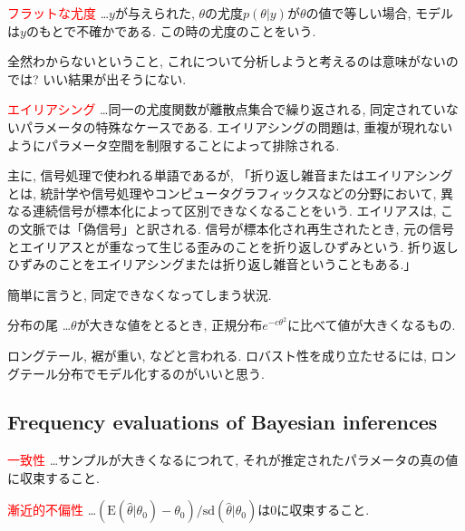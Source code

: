 \documentclass[11pt,a4pape,dvipdfmx]{jarticle}
\newcommand{\tcr}[1]{\textcolor{red}{#1}}
\begin{document}
\begin{itembox}[l]{\tcr{フラットな尤度}}
…$y$が与えられた, $\theta$の尤度$p(\theta|y)$が$\theta$の値で等しい場合, モデルは$y$のもとで不確かである.
この時の尤度のことをいう.
\end{itembox}

全然わからないということ, これについて分析しようと考えるのは意味がないのでは?
いい結果が出そうにない.

\begin{itembox}[l]{\tcr{エイリアシング}}
…同一の尤度関数が離散点集合で繰り返される, 同定されていないパラメータの特殊なケースである.
エイリアシングの問題は, 重複が現れないようにパラメータ空間を制限することによって排除される.
\end{itembox}

主に, 信号処理で使われる単語であるが,
「折り返し雑音またはエイリアシングとは, 統計学や信号処理やコンピュータグラフィックスなどの分野において, 異なる連続信号が標本化によって区別できなくなることをいう.
エイリアスは, この文脈では「偽信号」と訳される.
信号が標本化され再生されたとき, 元の信号とエイリアスとが重なって生じる歪みのことを折り返しひずみという.
折り返しひずみのことをエイリアシングまたは折り返し雑音ということもある.」

簡単に言うと, 同定できなくなってしまう状況.


\begin{itembox}[l]{分布の尾}
…$\theta$が大きな値をとるとき, 正規分布$e^{-c\theta^2}$に比べて値が大きくなるもの.
\end{itembox}

ロングテール, 裾が重い, などと言われる.
ロバスト性を成り立たせるには, ロングテール分布でモデル化するのがいいと思う.



\subsection{Frequency evaluations of Bayesian inferences}
\begin{itembox}[l]{\tcr{一致性}}
…サンプルが大きくなるにつれて, それが推定されたパラメータの真の値に収束すること.
\end{itembox}



\begin{itembox}[l]{\tcr{漸近的不偏性}}
…$(\text{E}(\hat{\theta}|\theta_0)-\theta_0)/\text{sd}(\hat{\theta}|\theta_0)$は0に収束すること.
\end{itembox}
\end{document}
